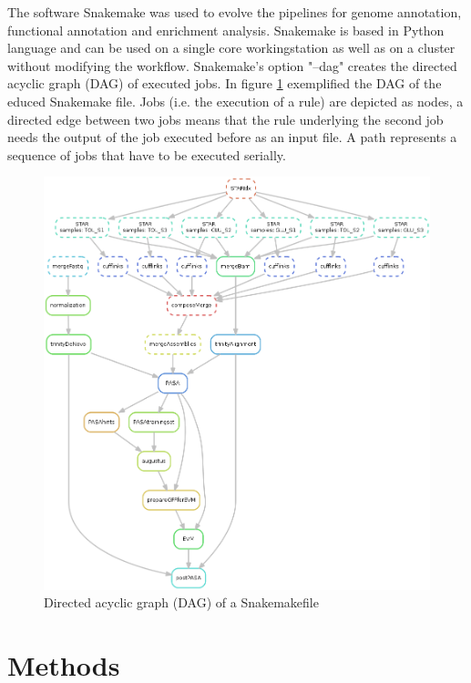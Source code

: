 \documentclass[12pt, a4paper]{report}
\begin{document}
The software Snakemake was used to evolve the pipelines for genome annotation, functional annotation and enrichment analysis. Snakemake is based in Python language and can be used on a single core workingstation as well as on a cluster without modifying the workflow. 
Snakemake's option "--dag" creates the directed acyclic graph (DAG) of executed jobs. \cite{Koster2012}  
\newline
In figure \ref{fig:DAG} exemplified the DAG of the educed Snakemake file. Jobs (i.e. the execution of a rule) are depicted as nodes, a directed edge between two jobs means that the rule underlying the second job needs the output of the job executed before as an input file. A path represents a sequence of jobs that have to be executed serially.
\begin{figure}[H]
	\centering	
	\includegraphics[width=430pt]{pics/DAG.png}
	\caption[Directed acyclic graph (DAG)]
	{Directed acyclic graph (DAG) of a Snakemakefile}
	\label{fig:DAG}
\end{figure}

\newpage
\setcounter{chapter}{2}\setcounter{section}{0}
\chapter*{Methods}
\end{document}
